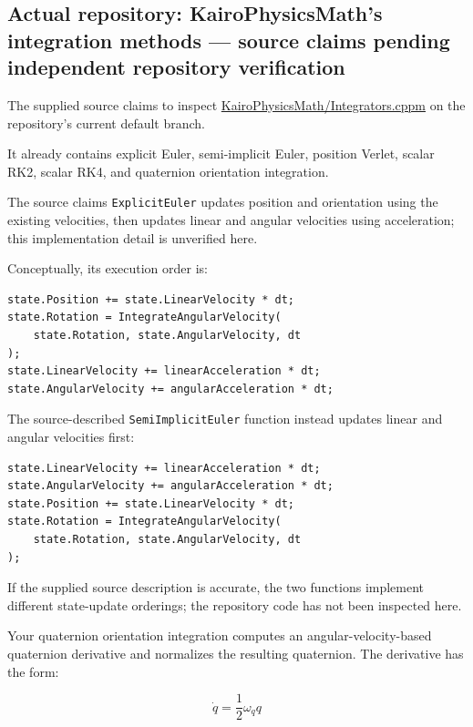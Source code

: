 \subsection{Actual repository: KairoPhysicsMath's integration methods --- source claims pending independent repository verification}\label{02-foundations-ii-ch025-actual-repository-kairophysicsmaths-integration-methods-source-claims-pending-independent-repository-verification}

The supplied source claims to inspect \href{https://github.com/swayam8624/KairoPhysicsMath/blob/main/Integrators.cppm?utm_source=chatgpt.com}{KairoPhysicsMath/Integrators.cppm} on the repository's current default branch.

It already contains explicit Euler, semi-implicit Euler, position Verlet, scalar RK2, scalar RK4, and quaternion orientation integration.

The source claims \texttt{ExplicitEuler} updates position and orientation using the existing velocities, then updates linear and angular velocities using acceleration; this implementation detail is unverified here.

Conceptually, its execution order is:

\begin{verbatim}
state.Position += state.LinearVelocity * dt;
state.Rotation = IntegrateAngularVelocity(
    state.Rotation, state.AngularVelocity, dt
);
state.LinearVelocity += linearAcceleration * dt;
state.AngularVelocity += angularAcceleration * dt;
\end{verbatim}

The source-described \texttt{SemiImplicitEuler} function instead updates linear and angular velocities first:

\begin{verbatim}
state.LinearVelocity += linearAcceleration * dt;
state.AngularVelocity += angularAcceleration * dt;
state.Position += state.LinearVelocity * dt;
state.Rotation = IntegrateAngularVelocity(
    state.Rotation, state.AngularVelocity, dt
);
\end{verbatim}

If the supplied source description is accurate, the two functions implement different state-update orderings; the repository code has not been inspected here.

Your quaternion orientation integration computes an angular-velocity-based quaternion derivative and normalizes the resulting quaternion. The derivative has the form:

\[
\dot q=\frac12\omega_q q
\]

